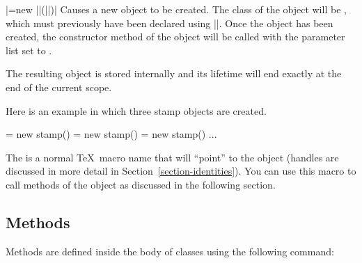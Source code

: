 \begin{command}{\pgfoonew{}|=new ||(||)|}
  Causes a new object to be created. The class of the object will be
  , which must previously have been declared using
  |\pgfooclass|. Once the object has been created, the constructor
  method of the object will be called with the parameter list set to
  .

  The resulting object is stored internally and its lifetime will
  end exactly at the end of the current scope.

  Here is an example in which three stamp objects are created.
\begin{codeexample}
\pgfoonew \firststamp  = new stamp()    
\pgfoonew \secondstamp = new stamp()
{
  \pgfoonew \thirdstamp = new stamp()
  ...
}
\end{codeexample}

  The  is a normal \TeX\ macro name that will
  ``point'' to the object (handles are discussed in more detail in
  Section~\ref{section-identities}). You can use this macro to call
  methods of the object as discussed in the following section.
\end{command}


\subsection{Methods}

Methods are defined inside the body of classes using the following
command: 

